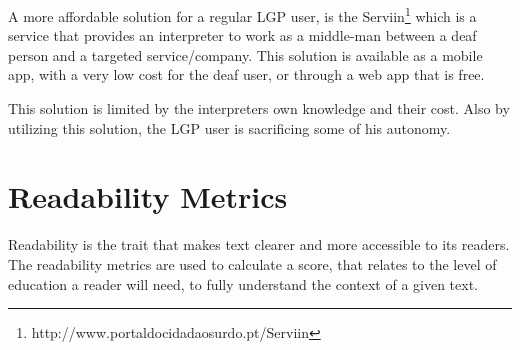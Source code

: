 A more affordable solution for a regular \gls{LGP} user, is the Serviin\footnote{http://www.portaldocidadaosurdo.pt/Serviin} which is a service that provides an interpreter to work as a middle-man between a deaf person and a targeted service/company.
This solution is available as a mobile app, with a very low cost for the deaf user, or through a  web app that is free.

This solution is limited by the interpreters own knowledge and their cost.
Also by utilizing this solution, the \gls{LGP} user is sacrificing some of his autonomy.

\section{Readability Metrics}

Readability is the trait that makes text clearer and more accessible to its readers.
The readability metrics are used to calculate a score\cite{meyer2003text}, that relates to the level of education a reader will need, to fully understand the context of a given text.

